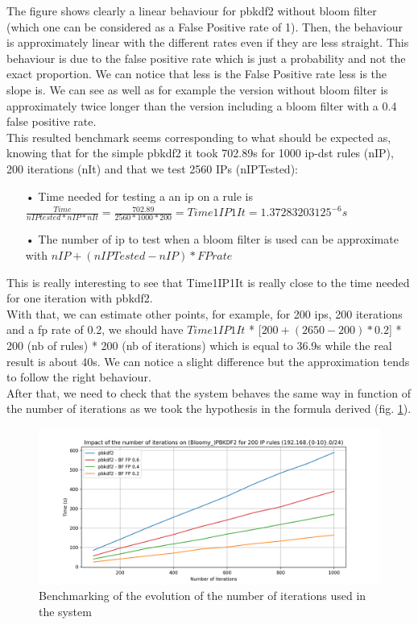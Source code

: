 \documentclass{eplmastersthesis}
\begin{document}
The figure shows clearly a linear behaviour for \gls{pbkdf2} without bloom filter (which one can be considered as a False Positive rate of 1). Then, the behaviour is approximately linear with the different rates even if they are less straight. This behaviour is due to the false positive rate which is just a probability and not the exact proportion. We can notice that less is the False Positive rate less is the slope is.
We can see as well as for example the version without bloom filter is approximately twice longer than the version including a bloom filter with a 0.4 false positive rate.\\

This resulted benchmark seems corresponding to what should be expected as, knowing that for the simple \gls{pbkdf2} it took 702.89s for 1000 ip-dst rules (nIP), 200 iterations (nIt) and that we test 2560 IPs (nIPTested):
\begin{itemize}
\item[•] Time needed for testing a an \gls{ip} on a rule is $\frac{Time}{nIPtested * nIP * nIt}=\frac{702.89}{2560*1000*200} = Time1IP1It = 1.37283203125^{-6}s$
\item[•] The number of \gls{ip} to test when a bloom filter is used can be approximate with $nIP + (nIPTested - nIP)*FPrate$
\end{itemize}
This is really interesting to see that Time1IP1It is really close to the time needed for one iteration with \gls{pbkdf2}.\\

With that, we can estimate other points, for example, for 200 \gls{ip}s, 200 iterations and a \gls{fp} rate of 0.2, we should have $Time1IP1It$ *  [$200 + (2650 - 200)*0.2$] * 200 (nb of rules) * 200 (nb of iterations) which is equal to 36.9s while the real result is about 40s. We can notice a slight difference but the approximation tends to follow the right behaviour.\\

After that, we need to check that the system behaves the same way in function of the number of iterations as we took the hypothesis in the formula derived (fig. \ref{benchmarking:timeiterations}). 

\begin{figure}[h!]
\begin{center}
	\includegraphics[scale=0.6]{res/TimeIterations}
	\caption{Benchmarking of the evolution of the number of iterations used in the system}
	\label{benchmarking:timeiterations}
\end{center}
\end{figure}
\end{document}

